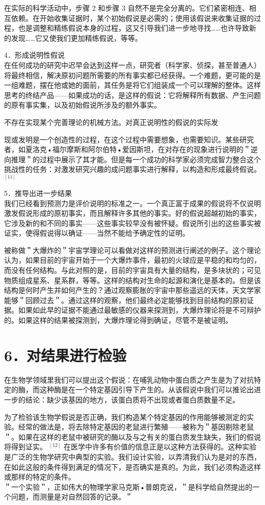 在实际的科学活动中，步骤 2 和步骤 3 自然不是完全分离的。它们紧密相连、相互依赖。在开始收集证据时，某个初始假说是必需的；使用该假说来收集证据的过程，也是调整和精练假说本身的过程，这又引导我们进一步地寻找……也许导致新的发现……它又使我们更加精练假说，等等。

4．形成说明性假说\\
在任何成功的研究中迟早会达到这样一点，研究者（科学家、侦探，甚至普通人）将最终相信，解决原初问题所需要的所有事实都已经获得。一个难题，更可能的是一组难题，摆在他或她的面前，其任务是将它们组装成一个可以理解的整体。这样思考的终结产品——如果成功的话，是这样的假说：它将解释所有数据、产生问题的原有事实集，以及初始假说所涉及的额外事实。

不存在实现某个完善理论的机械方法。对真正说明性的假说的实际发

现或发明是一个创造性的过程，在这个过程中需要想象，也需要知识。某些研究者，如夏洛克•福尔摩斯和阿尔伯特•爱因斯坦，在对存在的现象进行说明的＂逆向推理＂的过程中展示了其才能。但是每一个成功的科学家必须完成智力整合这个挑战性的任务：对激发研究兴趣的成问题事实进行解释，以构造和形成最终假说。 ${ }^{[11]}$

5．推导出进一步结果\\
我们已经看到预测力是评价说明的标准之一。一个真正富于成果的假说将不仅说明激发假说形成的原初事实，而且解释许多其他的事实。好的假说超越初始的事实，它涉及新的和不同的事实——这些事实较早没有被怀疑。假说所引出的这些事实被证实，使得假说得以确证——当然不能给予确定性的证明。

被称做＂大爆炸的＂宇宙学理论可以看做对这样的预测进行阐述的例子。这个理论认为，如果目前的宇宙开始于一个大爆炸事件，最初的火球应是平稳的和均匀的，而没有任何结构。与此对照的是，目前的宇宙具有大量的结构，是多块状的；可见物质组成星系、星系群，等等。这样的结构对生命的起源和演化是基本的。但是该结构是何时产生并如何产生的？通过观察膨胀的宇宙中那些遥远的天体，天文学家能够＂回顾过去＂。通过这样的观察，他们最终必定能够找到目前结构的原初证据。如果如此早的证据不能通过最敏感的仪器来探测到，大爆炸理论将是不可辩护的。如果这样的结果被探测到，大爆炸理论得到确证，尽管不是被证明。

\section*{6．对结果进行检验}
在生物学领域里我们可以提出这个假说：在哺乳动物中蛋白质之产生是为了对抗特定的酶，而这种酶是在一个特定基因引导下产生的。从该假说中我们可以推论出进一步的结论：缺少该基因的地方，该蛋白质将不出现或者蛋白质数量不足。

为了检验该生物学假说是否正确，我们构造某个特定基因的作用能够被测定的实验。经常的做法是，将去除特定基因的老鼠进行繁殖——被称为＂基因剔除老鼠＂。如果在这样的老鼠中被研究的酶以及与之有关的蛋白质发生缺失，我们的假说将得到证实。 ${ }^{[12]}$ 在医学中许多有价值的信息正是以这种方法获得的。这种实验是广泛的生物学研究中典型的实验。我们设计实验，以弄清我们认为是对的东西，在如此这般的条件得到满足的情况下，是否确实是真的。为此，我们必须构造这样或那样的特定的条件。\\
＂一个实验＂，正如伟大的物理学家马克斯•普朗克说，＂是科学给自然提出的一个问题，而测量是对自然回答的记录。＂

